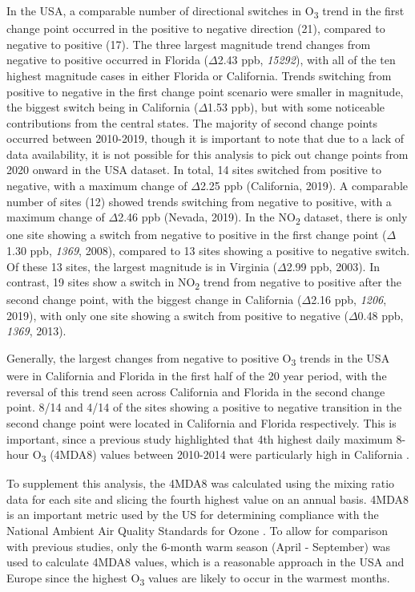 \documentclass[journal abbreviation, manuscript]{copernicus}
\begin{document}
In the USA, a comparable number of directional switches in O\textsubscript{3} trend in the first change point occurred in the positive to negative direction (21), compared to negative to positive (17). The three largest magnitude trend changes from negative to positive occurred in Florida ($\Delta$2.43 ppb, \textit{15292}), with all of the ten highest magnitude cases in either Florida or California. Trends switching from positive to negative in the first change point scenario were smaller in magnitude, the biggest switch being in California ($\Delta$1.53 ppb), but with some noticeable contributions from the central states. The majority of second change points occurred between 2010-2019, though it is important to note that due to a lack of data availability, it is not possible for this analysis to pick out change points from 2020 onward in the USA dataset. In total, 14 sites switched from positive to negative, with a maximum change of $\Delta$2.25 ppb (California, 2019). A comparable number of sites (12) showed trends switching from negative to positive, with a maximum change of $\Delta$2.46 ppb (Nevada, 2019). In the NO\textsubscript{2} dataset, there is only one site showing a switch from negative to positive in the first change point ($\Delta$1.30 ppb, \textit{1369}, 2008), compared to 13 sites showing a positive to negative switch. Of these 13 sites, the largest magnitude is in Virginia ($\Delta$2.99 ppb, 2003). In contrast, 19 sites show a switch in NO\textsubscript{2} trend from negative to positive after the second change point, with the biggest change in California ($\Delta$2.16 ppb, \textit{1206}, 2019), with only one site showing a switch from positive to negative ($\Delta$0.48 ppb, \textit{1369}, 2013).

Generally, the largest changes from negative to positive O\textsubscript{3} trends in the USA were in California and Florida in the first half of the 20 year period, with the reversal of this trend seen across California and Florida in the second change point. 8/14 and 4/14 of the sites showing a positive to negative transition in the second change point were located in California and Florida respectively. This is important, since a previous study highlighted that 4th highest daily maximum 8-hour O\textsubscript{3} (4MDA8) values between 2010-2014 were particularly high in California \citep{fleming_2018}. 

To supplement this analysis, the 4MDA8 was calculated using the mixing ratio data for each site and slicing the fourth highest value on an annual basis. 4MDA8 is an important metric used by the US for determining compliance with the National Ambient Air Quality Standards for Ozone \citep{EPA_2015, Berrocal_4MDA8}. To allow for comparison with previous studies, only the 6-month warm season (April - September) was used to calculate 4MDA8 values, which is a reasonable approach in the USA and Europe since the highest O\textsubscript{3} values are likely to occur in the warmest months.
\end{document}
